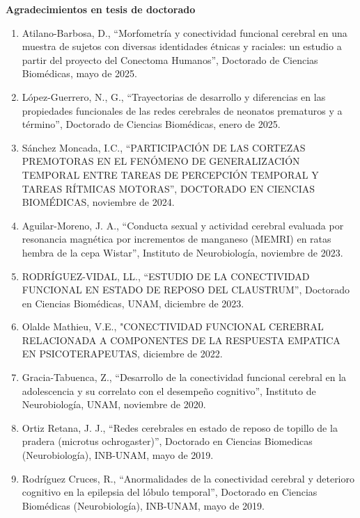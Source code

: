 \textbf{Agradecimientos en tesis de doctorado}

\begin{enumerate}
\item Atilano-Barbosa, D., “Morfometría y conectividad funcional cerebral en una muestra de sujetos con diversas identidades 
étnicas y raciales: un estudio a partir del proyecto del Conectoma Humanos”, Doctorado de Ciencias Biomédicas, mayo de 2025.

\item López-Guerrero, N., G., “Trayectorias de desarrollo y diferencias en las propiedades funcionales de las redes 
cerebrales 
de neonatos prematuros y a término”, Doctorado de Ciencias Biomédicas, enero de 2025.

\item Sánchez Moncada, I.C., “PARTICIPACIÓN DE LAS CORTEZAS PREMOTORAS EN EL FENÓMENO DE GENERALIZACIÓN TEMPORAL ENTRE TAREAS 
DE 
PERCEPCIÓN TEMPORAL Y TAREAS RÍTMICAS MOTORAS”, DOCTORADO EN CIENCIAS BIOMÉDICAS, noviembre de 
2024.

\item Aguilar-Moreno, J. A., “Conducta sexual y actividad cerebral evaluada por resonancia magnética por incrementos de 
manganeso (MEMRI) en ratas hembra de la cepa Wistar”, Instituto de Neurobiología, 
noviembre de 2023.

\item RODRÍGUEZ-VIDAL, LL., “ESTUDIO DE LA CONECTIVIDAD FUNCIONAL EN ESTADO DE REPOSO DEL CLAUSTRUM”,
 Doctorado en Ciencias Biomédicas, UNAM, diciembre de 2023.

\item Olalde Mathieu, V.E., "CONECTIVIDAD FUNCIONAL CEREBRAL RELACIONADA A COMPONENTES DE LA RESPUESTA EMPATICA EN 
PSICOTERAPEUTAS, diciembre de 2022.

\item Gracia-Tabuenca, Z., “Desarrollo de la conectividad funcional cerebral en la adolescencia y su correlato con el 
desempeño 
cognitivo”, Instituto de Neurobiología, UNAM, noviembre de 2020.

\item Ortiz Retana, J. J., “Redes cerebrales en estado de reposo de topillo de la pradera (microtus ochrogaster)”, Doctorado 
en 
Ciencias Biomedicas (Neurobiología), INB-UNAM, mayo de 2019.

\item Rodríguez Cruces, R., “Anormalidades de la conectividad cerebral y deterioro cognitivo en la epilepsia del lóbulo 
temporal”, Doctorado en Ciencias Biomédicas (Neurobiología), INB-UNAM, mayo de 2019.


\end{enumerate}

